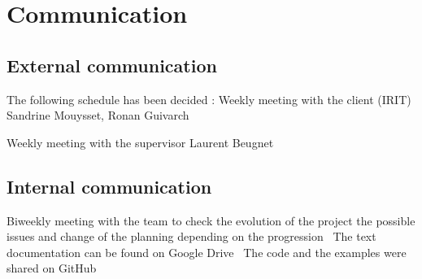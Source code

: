 \section{Communication}
\subsection{External communication}
The following schedule has been decided :
Weekly meeting with the client (IRIT) Sandrine Mouysset, Ronan Guivarch
\

Weekly meeting with the supervisor Laurent Beugnet
\
\subsection{Internal communication}
Biweekly meeting with the team to check the evolution of the project the possible issues and change of the planning depending on the progression
\
The text documentation can be found on Google Drive
\
The code and the examples were shared on  GitHub


